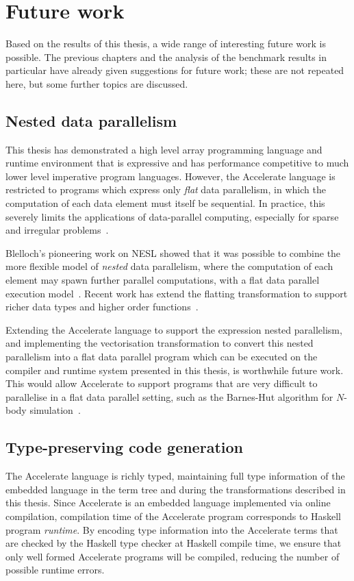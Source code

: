 \section{Future work}

Based on the results of this thesis, a wide range of interesting future work is
possible. The previous chapters and the analysis of the benchmark results in
particular have already given suggestions for future work; these are not
repeated here, but some further topics are discussed.

\subsection{Nested data parallelism}

This thesis has demonstrated a high level array programming language and runtime
environment that is expressive and has performance competitive to much lower
level imperative program languages. However, the Accelerate language is
restricted to programs which express only \emph{flat} data parallelism, in which
the computation of each data element must itself be sequential. In practice,
this severely limits the applications of data-parallel computing, especially for
sparse and irregular problems~\cite{Prins:1999}.

Blelloch's pioneering work on NESL showed that it was possible to combine the
more flexible model of \emph{nested} data parallelism, where the computation of
each element may spawn further parallel computations, with a flat data parallel
execution model~\cite{Blelloch:1988iu}. Recent work has extend the flatting
transformation to support richer data types and higher order
functions~\cite{Jones:2008uu}.

Extending the Accelerate language to support the expression nested parallelism,
and implementing the vectorisation transformation to convert this nested
parallelism into a flat data parallel program which can be executed on the
compiler and runtime system presented in this thesis, is worthwhile future work.
This would allow Accelerate to support programs that are very difficult to
parallelise in a flat data parallel setting, such as the Barnes-Hut algorithm
for $N$-body simulation~\cite{Barnes:1986}.


\subsection{Type-preserving code generation}

The Accelerate language is richly typed, maintaining full type information of
the embedded language in the term tree and during the transformations described
in this thesis. Since Accelerate is an embedded language implemented via online
compilation, compilation time of the Accelerate program corresponds to Haskell
program \emph{runtime}. By encoding type information into the Accelerate terms
that are checked by the Haskell type checker at Haskell compile time, we ensure
that only well formed Accelerate programs will be compiled, reducing the number
of possible runtime errors.

